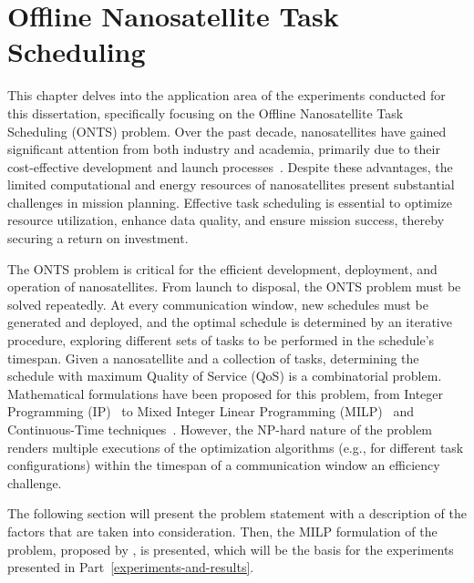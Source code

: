 

\chapter{Offline Nanosatellite Task Scheduling}\label{chap:onts}

This chapter delves into the application area of the experiments conducted for this dissertation, specifically focusing on the Offline Nanosatellite Task Scheduling (ONTS) problem.
Over the past decade, nanosatellites have gained significant attention from both industry and academia, primarily due to their cost-effective development and launch processes~\cite{shiromaCubeSatsBrightFuture2011,luciaComputationalNanosatelliteConstellations2021,nagelNanosatellitesAppliedOptical2020,saeedCubeSatCommunicationsRecent2020}.
Despite these advantages, the limited computational and energy resources of nanosatellites present substantial challenges in mission planning.
Effective task scheduling is essential to optimize resource utilization, enhance data quality, and ensure mission success, thereby securing a return on investment.

The ONTS problem is critical for the efficient development, deployment, and operation of nanosatellites.
From launch to disposal, the ONTS problem must be solved repeatedly.
At every communication window, new schedules must be generated and deployed, and the optimal schedule is determined by an iterative procedure, exploring different sets of tasks to be performed in the schedule's timespan.
Given a nanosatellite and a collection of tasks, determining the schedule with maximum Quality of Service (QoS) is a combinatorial problem.
Mathematical formulations have been proposed for this problem, from Integer Programming (IP)~\cite{rigoTaskSchedulingOptimal2021} to Mixed Integer Linear Programming (MILP)~\cite{rigoNanosatelliteTaskScheduling2021,semanEnergyAwareTaskScheduling2022} and Continuous-Time techniques~\cite{camponogaraContinuoustimeFormulationOptimal2022}.
However, the NP-hard nature of the problem renders multiple executions of the optimization algorithms (e.g., for different task configurations) within the timespan of a communication window an efficiency challenge.

The following section will present the problem statement with a description of the factors that are taken into consideration.
Then, the MILP formulation of the problem, proposed by , is presented, which will be the basis for the experiments presented in Part~\ref{experiments-and-results}.


